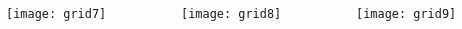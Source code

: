\documentclass{beamer}
\begin{document}
\begin{frame}
\begin{columns}[t]
\begin{column}{0.3\textwidth}
\begin{center}
        \texttt{[image: grid7]}
      \end{center}
    \end{column}
    \begin{column}{0.3\textwidth}
      \begin{center}
        \texttt{[image: grid8]}
      \end{center}
    \end{column}
    \begin{column}{0.3\textwidth}
      \begin{center}
        \texttt{[image: grid9]}
      \end{center}
    \end{column}
  \end{columns}
\end{frame}
\end{document}
